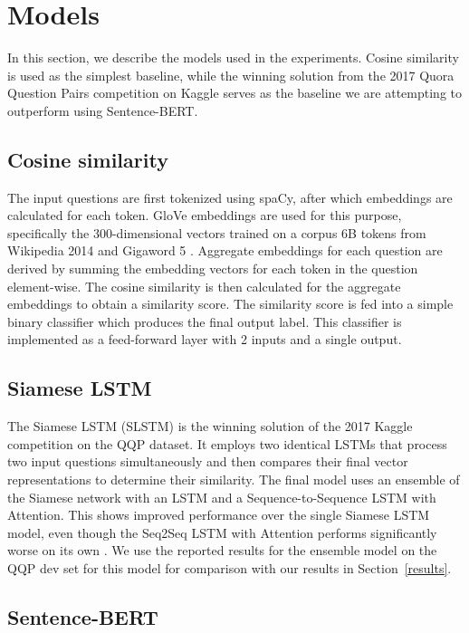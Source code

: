 \documentclass[10pt, a4paper]{article}
\begin{document}
\section{Models} \label{models}

In this section, we describe the models used in the experiments.
Cosine similarity is used as the simplest baseline, while the winning solution from the 2017 Quora Question Pairs competition on Kaggle serves as the baseline we are attempting to outperform using Sentence-BERT.

\subsection{Cosine similarity} \label{cosine-similarity}

The input questions are first tokenized using spaCy, after which embeddings are calculated for each token.
GloVe embeddings are used for this purpose, specifically the 300-dimensional vectors trained on a corpus 6B tokens from Wikipedia 2014 and Gigaword 5 \citep{pennington2014glove}.
Aggregate embeddings for each question are derived by summing the embedding vectors for each token in the question element-wise.
The cosine similarity is then calculated for the aggregate embeddings to obtain a similarity score.
The similarity score is fed into a simple binary classifier which produces the final output label.
This classifier is implemented as a feed-forward layer with 2 inputs and a single output.

\subsection{Siamese LSTM} \label{siamese-lstm}

The Siamese LSTM (SLSTM) is the winning solution of the 2017 Kaggle competition on the QQP dataset.
It employs two identical LSTMs that process two input questions simultaneously and then compares their final vector representations to determine their similarity.
The final model uses an ensemble of the Siamese network with an LSTM and a Sequence-to-Sequence LSTM with Attention.
This shows improved performance over the single Siamese LSTM model, even though the Seq2Seq LSTM with Attention performs significantly worse on its own \citep{dadashov2017quora}.
We use the reported results for the ensemble model on the QQP dev set for this model for comparison with our results in Section~\ref{results}.

\subsection{Sentence-BERT}
\end{document}
